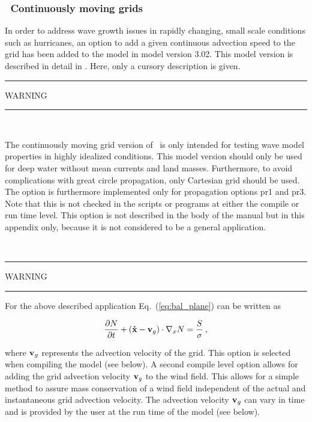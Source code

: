 \vsssub
\subsubsection{~Continuously moving grids} \label{sub:num_move}


\vspace{\baselineskip} 

\noindent
In order to address wave growth issues in rapidly changing, small scale
conditions such as hurricanes, an option to add a given continuous advection
speed to the grid has been added to the model in model version 3.02. This
model version is described in detail in \cite{tol:OMOD05b}. Here, only a
cursory description is given.

\begin{center}
\rule[1mm]{55mm}{1.0mm} WARNING \rule[1mm]{55mm}{1.0mm} \\
 \vspace{\baselineskip}
\parbox{120mm}{The continuously moving grid version of \ws\ is only intended 
for testing wave model properties in highly idealized conditions. This model
version should only be used for deep water without mean currents and land
masses. Furthermore, to avoid complications with great circle propagation,
only Cartesian grid should be used. The option is furthermore implemented only
for propagation options {\F pr1} and {\F pr3}. Note that this is not checked
in the scripts or programs at either the compile or run time level.  This
option is not described in the body of the manual but in this appendix only,
because it is not considered to be a general application.} \\
\vspace{\baselineskip}
\rule[1mm]{55mm}{1.0mm} WARNING \rule[1mm]{55mm}{1.0mm}
\end{center}

\noindent
For the above described application Eq.~(\ref{eq:bal_plane}) can be written as

\begin{equation}
\frac{\partial N}{\partial t} + 
\left ( {\bf\dot{x}}-{\bf{v}}_g \right ) \cdot \nabla_x N  = 
\frac{S}{\sigma} \: , \label{eq:bal_move}
\end{equation}

\noindent
where ${\bf{v}}_g$ represents the advection velocity of the grid. This option
is selected when compiling the model (see below). A second compile level
option allows for adding the grid advection velocity ${\bf{v}}_g$ to the wind
field. This allows for a simple method to assure mass conservation of a wind
field independent of the actual and instantaneous grid advection velocity. The
advection velocity ${\bf{v}}_g$ can vary in time and is provided by the user
at the run time of the model (see below).

